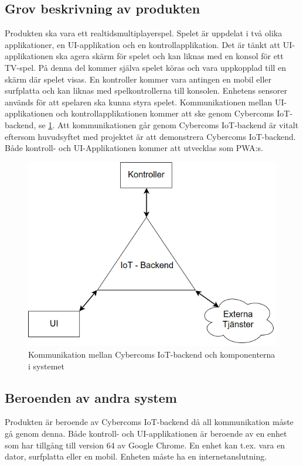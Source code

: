 \documentclass[10pt]{article}
\begin{document}
	\subsection{Grov beskrivning av produkten}
	Produkten ska vara ett realtidsmultiplayerspel. Spelet är uppdelat i två olika applikationer, en UI-applikation och en kontrollapplikation. Det är tänkt att UI-applikationen ska agera skärm för spelet och kan liknas med en konsol för ett TV-spel. På denna del kommer själva spelet köras och vara uppkopplad till en skärm där spelet visas. En kontroller kommer vara antingen en mobil eller surfplatta och kan liknas med spelkontrollerna till konsolen. Enhetens sensorer används för att spelaren ska kunna styra spelet. Kommunikationen mellan UI-applikationen och kontrollapplikationen kommer att ske genom Cybercoms IoT-backend, se \ref{fig:backend}. Att kommunikationen går genom Cybercoms IoT-backend är vitalt eftersom huvudsyftet med projektet är att demonstrera Cybercoms IoT-backend.  Både kontroll- och UI-Applikationen kommer att utvecklas som PWA:s. 
	
	\begin{figure}[h]
		\centering
		\includegraphics[scale=0.4]{backend}
		\caption{Kommunikation mellan Cybercoms IoT-backend och komponenterna i systemet}
		\label{fig:backend}
	\end{figure}
	
	
	\subsection{Beroenden av andra system}
	Produkten är beroende av Cybercoms IoT-backend då all kommunikation måste gå genom denna. Både kontroll- och UI-applikationen är beroende av en enhet som har tillgång till version 64 av Google Chrome. En enhet kan t.ex. vara en dator, surfplatta eller en mobil. Enheten måste ha en internetanslutning.
\end{document}
